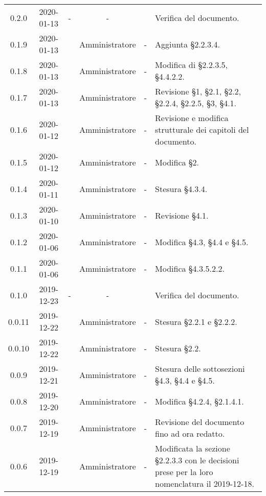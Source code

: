 {\begin{longtable}{ c c  C{2.5cm} c C{3cm} C{3.5cm}}
0.2.0 & 2020-01-13 & - & - & \PF{} & Verifica del documento.  \\ 

0.1.9 & 2020-01-13 & \CE{} & Amministratore & - & Aggiunta §2.2.3.4. \\

0.1.8 & 2020-01-13 & \BR{} & Amministratore & - & Modifica di §2.2.3.5, §4.4.2.2. \\

0.1.7 & 2020-01-13 & \AT{} & Amministratore & - & Revisione §1, §2.1, §2.2, §2.2.4, §2.2.5, §3, §4.1. \\

0.1.6 & 2020-01-12 & \MC{} & Amministratore & - & Revisione e modifica strutturale dei capitoli del documento. \\

0.1.5 & 2020-01-12 & \AT{} & Amministratore & - & Modifica §2. \\

0.1.4 & 2020-01-11 & \MC{} & Amministratore & - & Stesura §4.3.4. \\

0.1.3 & 2020-01-10 & \MC{} & Amministratore & - & Revisione §4.1. \\

0.1.2 & 2020-01-06 & \AT{} & Amministratore & - & Modifica §4.3, §4.4 e §4.5. \\

0.1.1 & 2020-01-06 & \AT{} & Amministratore & - & Modifica §4.3.5.2.2. \\

0.1.0 & 2019-12-23 & - & - & \CE{} & Verifica del documento. \\

0.0.11 & 2019-12-22 & \PF{} & Amministratore & - & Stesura §2.2.1 e §2.2.2. \\

0.0.10 & 2019-12-22 & \PF{} & Amministratore & - & Stesura §2.2. \\

0.0.9 & 2019-12-21 & \PF{} & Amministratore & - & Stesura delle sottosezioni §4.3, §4.4 e §4.5. \\

0.0.8 & 2019-12-20 & \MC{} & Amministratore & - & Modifica §4.2.4, §2.1.4.1. \\

0.0.7 & 2019-12-19 & \SE{} & Amministratore & - & Revisione del documento fino ad ora redatto. \\

0.0.6 & 2019-12-19 & \CE{} & Amministratore & - & Modificata la sezione §2.2.3.3 con le decisioni prese per la loro nomenclatura il 2019-12-18. \\


\end{longtable}}
